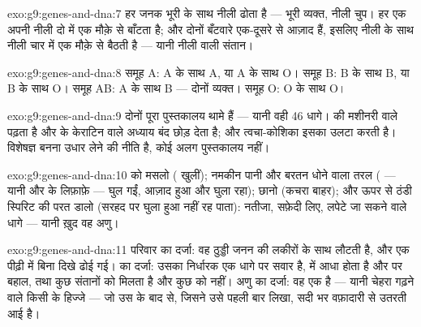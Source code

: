 \begin{solution}{exo:g9:genes-and-dna:7}
हर जनक भूरी के साथ नीली ढोता है --- भूरी व्यक्त, नीली चुप। हर एक अपनी
नीली दो में एक मौक़े से बाँटता है; और दोनों बँटवारे एक-दूसरे से आज़ाद हैं,
इसलिए नीली के साथ नीली चार में एक मौक़े से बैठती है --- यानी नीली 
वाली संतान।
\end{solution}

\begin{solution}{exo:g9:genes-and-dna:8}
समूह A: A के साथ A, या A के साथ O। समूह B: B के साथ B, या B के साथ O।
समूह AB: A के साथ B --- दोनों व्यक्त। समूह O: O के साथ O।
\end{solution}

\begin{solution}{exo:g9:genes-and-dna:9}
दोनों पूरा पुस्तकालय थामे हैं --- यानी वही 46 धागे।   की
मशीनरी वाले  पढ़ता है और  के केराटिन वाले अध्याय बंद छोड़ देता
है; और त्वचा-कोशिका इसका उलटा करती है। विशेषज्ञ बनना उधार लेने की नीति
है, कोई अलग पुस्तकालय नहीं।
\end{solution}

\begin{solution}{exo:g9:genes-and-dna:10}
 को मसलो ( खुलीं); नमकीन पानी और बरतन धोने वाला तरल (
--- यानी  और  के लिफ़ाफ़े --- घुल गईं,  आज़ाद हुआ और घुला
रहा); छानो (कचरा बाहर); और ऊपर से ठंडी स्पिरिट की परत डालो (सरहद पर 
घुला हुआ नहीं रह पाता): नतीजा, सफ़ेदी लिए, लपेटे जा सकने वाले धागे ---
यानी ख़ुद वह अणु।
\end{solution}

\begin{solution}{exo:g9:genes-and-dna:11}
परिवार का दर्जा: वह ठुड्डी जनन की लकीरों के साथ लौटती है, और एक पीढ़ी में
बिना दिखे ढोई गई।  का दर्जा: उसका निर्धारक एक धागे पर सवार है,
 में आधा होता है और  पर बहाल, तथा कुछ संतानों को मिलता है
और कुछ को नहीं। अणु का दर्जा: वह एक  है --- यानी चेहरा गढ़ने वाले
किसी  के हिज्जे --- जो उस  के बाद से, जिसने उसे पहली बार
लिखा, सदी भर वफ़ादारी से उतरती आई है।
\end{solution}

